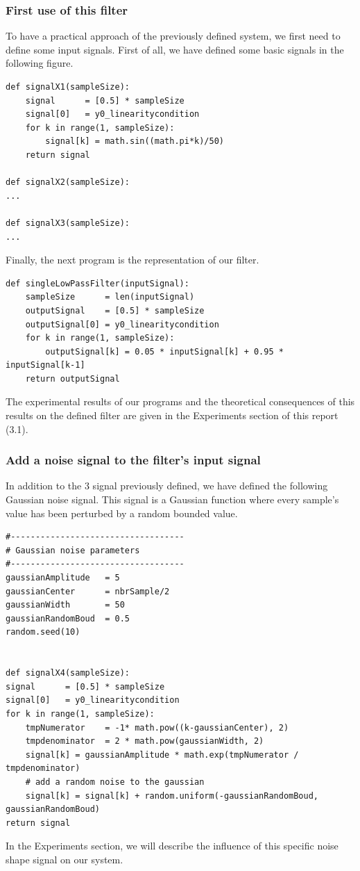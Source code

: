 \documentclass[a4paper,10pt]{article}
\begin{document}
	\subsubsection{First use of this filter}
	To have a practical approach of the previously defined system, we first need to define some input signals.  First of all, we have defined some basic signals in the following figure.
	\begin{lstlisting}
def signalX1(sampleSize):
    signal      = [0.5] * sampleSize
    signal[0]   = y0_linearitycondition
    for k in range(1, sampleSize):
        signal[k] = math.sin((math.pi*k)/50)
    return signal

def signalX2(sampleSize):
...

def signalX3(sampleSize):
...

\end{lstlisting}
	Finally, the next program is the representation of our filter.\newline
	\begin{lstlisting}
def singleLowPassFilter(inputSignal):
    sampleSize      = len(inputSignal)
    outputSignal    = [0.5] * sampleSize
    outputSignal[0] = y0_linearitycondition
    for k in range(1, sampleSize):
        outputSignal[k] = 0.05 * inputSignal[k] + 0.95 * inputSignal[k-1]
    return outputSignal
	\end{lstlisting}
	The experimental results of our programs and the theoretical consequences of this results on the defined filter are given in the Experiments section of this report (3.1).\newline



	\subsubsection{Add a noise signal to the filter's input signal}
	In addition to the 3 signal previously defined, we have defined the following Gaussian noise signal.
	This signal is a Gaussian function where every sample's value has been perturbed by a random bounded value.
	\begin{lstlisting}
#-----------------------------------
# Gaussian noise parameters
#-----------------------------------
gaussianAmplitude   = 5
gaussianCenter      = nbrSample/2
gaussianWidth       = 50
gaussianRandomBoud  = 0.5
random.seed(10)


def signalX4(sampleSize):
signal      = [0.5] * sampleSize
signal[0]   = y0_linearitycondition
for k in range(1, sampleSize):
    tmpNumerator    = -1* math.pow((k-gaussianCenter), 2)
    tmpdenominator  = 2 * math.pow(gaussianWidth, 2)
    signal[k] = gaussianAmplitude * math.exp(tmpNumerator / tmpdenominator)
    # add a random noise to the gaussian
    signal[k] = signal[k] + random.uniform(-gaussianRandomBoud, gaussianRandomBoud)
return signal
	\end{lstlisting}
	In the Experiments section, we will describe the influence of this specific noise shape signal on our system.
\end{document}
